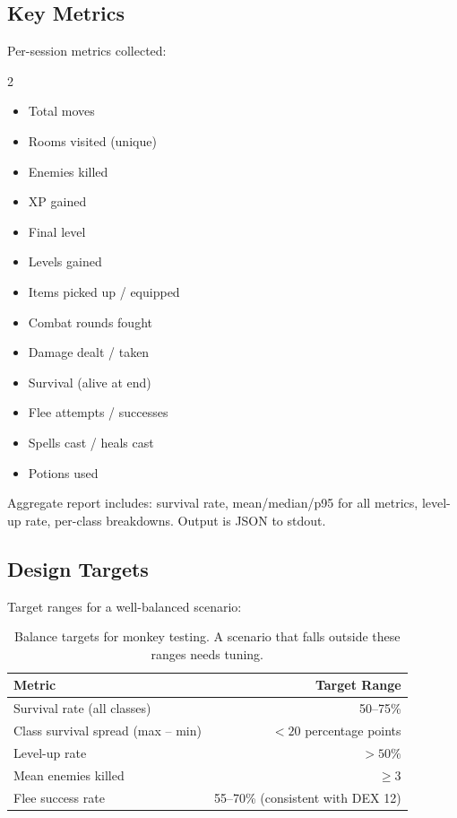 \documentclass[a4paper,10pt]{article}
\newcommand{\stat}[1]{\textsc{#1}}
\begin{document}
\subsection{Key Metrics}

Per-session metrics collected:

\begin{multicols}{2}
\begin{itemize}[nosep]
  \item Total moves
  \item Rooms visited (unique)
  \item Enemies killed
  \item XP gained
  \item Final level
  \item Levels gained
  \item Items picked up / equipped
  \item Combat rounds fought
  \item Damage dealt / taken
  \item Survival (alive at end)
  \item Flee attempts / successes
  \item Spells cast / heals cast
  \item Potions used
\end{itemize}
\end{multicols}

Aggregate report includes: survival rate, mean/median/p95 for all metrics,
level-up rate, per-class breakdowns. Output is JSON to stdout.

\subsection{Design Targets}

Target ranges for a well-balanced scenario:

\begin{table}[h]
\centering
\begin{tabular}{@{}lr@{}}
\toprule
\textbf{Metric} & \textbf{Target Range} \\
\midrule
Survival rate (all classes)          & 50--75\% \\
Class survival spread (max -- min)   & $< 20$ percentage points \\
Level-up rate                        & $> 50\%$ \\
Mean enemies killed                  & $\geq 3$ \\
Flee success rate                    & 55--70\% (consistent with \stat{DEX} 12) \\
\bottomrule
\end{tabular}
\caption{Balance targets for monkey testing. A scenario that falls outside
         these ranges needs tuning.}
\end{table}
\end{document}

